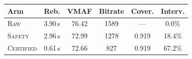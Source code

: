 \begin{tabular}{@{}lccccc@{}}
\toprule
\textbf{Arm} & \textbf{Reb.} & \textbf{VMAF} & \textbf{Bitrate} & \textbf{Cover.} & \textbf{Interv.} \\
\midrule
\textsc{Raw} & 3.90\,s & 76.42 & 1589 & --- & 0.0\% \\
\textsc{Safety} & 2.96\,s & 72.99 & 1278 & 0.919 & 18.4\% \\
\textsc{Certified} & 0.61\,s & 72.66 & 827 & 0.919 & 67.2\% \\
\bottomrule
\end{tabular}

